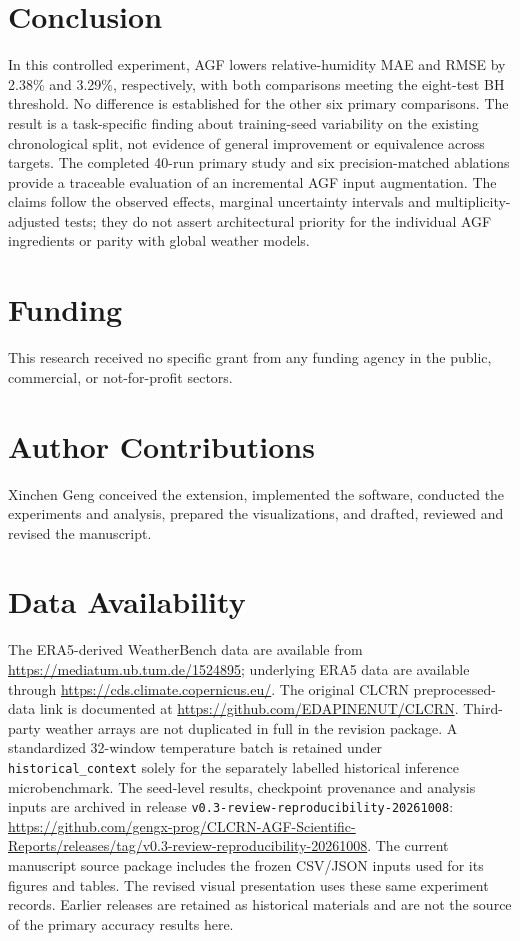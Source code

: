 \documentclass[fleqn,10pt]{wlscirep}
\begin{document}
\section{Conclusion}\label{sec:conclusion}
In this controlled experiment, AGF lowers relative-humidity MAE and RMSE
by 2.38\% and 3.29\%, respectively, with both comparisons meeting the
eight-test BH threshold. No difference is established for the other six
primary comparisons. The result is a task-specific finding about
training-seed variability on the existing chronological split, not evidence
of general improvement or equivalence across targets.
The completed 40-run primary study and six precision-matched ablations
provide a traceable evaluation of an incremental AGF input augmentation.
The claims follow the observed effects, marginal uncertainty intervals and
multiplicity-adjusted tests; they do not assert architectural priority for
the individual AGF ingredients or parity with global weather models.

\section{Funding}
This research received no specific grant from any funding agency in the
public, commercial, or not-for-profit sectors.

\section{Author Contributions}
Xinchen Geng conceived the extension, implemented the software, conducted
the experiments and analysis, prepared the visualizations, and drafted,
reviewed and revised the manuscript.


\section{Data Availability}
The ERA5-derived WeatherBench data are available from
\url{https://mediatum.ub.tum.de/1524895}; underlying ERA5 data are available
through \url{https://cds.climate.copernicus.eu/}. The original CLCRN
preprocessed-data link is documented at
\url{https://github.com/EDAPINENUT/CLCRN}. Third-party weather arrays are
not duplicated in full in the revision package. A standardized 32-window
temperature batch is retained under \texttt{historical\_context} solely for
the separately labelled historical inference microbenchmark.
The seed-level results, checkpoint provenance and analysis inputs are
archived in release \texttt{v0.3-review-reproducibility-20261008}:
\url{https://github.com/gengx-prog/CLCRN-AGF-Scientific-Reports/releases/tag/v0.3-review-reproducibility-20261008}.
The current manuscript source package includes the frozen CSV/JSON inputs
used for its figures and tables. The revised visual presentation uses these
same experiment records. Earlier releases are retained as historical
materials and are not the source of the primary accuracy results here.
\end{document}
